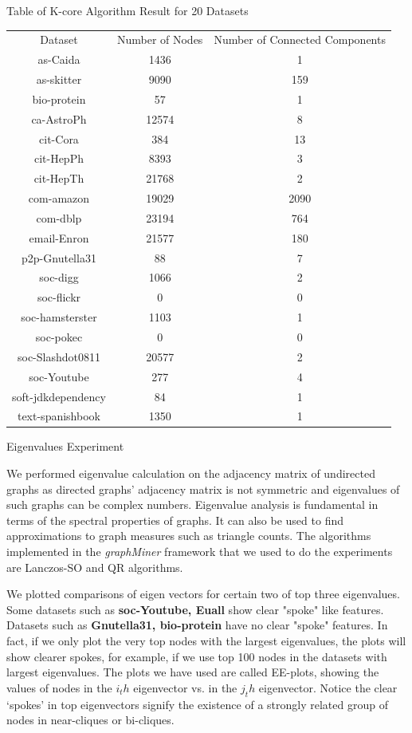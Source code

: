 \begin{center}
Table of K-core Algorithm Result for 20 Datasets
\begin{tabular}{ |c|c|c| }
 \hline
 Dataset & Number of Nodes & Number of Connected Components \\
  as-Caida & 1436 & 1 \\
  as-skitter & 9090 & 159 \\
  bio-protein & 57 & 1 \\
  ca-AstroPh & 12574 & 8 \\
  cit-Cora & 384 & 13 \\
  cit-HepPh & 8393 & 3 \\
  cit-HepTh & 21768 & 2 \\
  com-amazon & 19029 & 2090 \\
  com-dblp & 23194 & 764 \\
  email-Enron & 21577 & 180 \\
  p2p-Gnutella31 & 88 & 7 \\
  soc-digg & 1066 & 2 \\
  soc-flickr & 0 & 0 \\
  soc-hamsterster & 1103 & 1 \\
  soc-pokec & 0 & 0 \\
  soc-Slashdot0811 & 20577 & 2 \\
  soc-Youtube & 277 & 4 \\
  soft-jdkdependency & 84 & 1 \\
  text-spanishbook & 1350 & 1 \\
 \hline
\end{tabular}
\end{center}


Eigenvalues Experiment

We performed eigenvalue calculation on the adjacency matrix of undirected graphs as directed graphs' adjacency matrix is not symmetric and eigenvalues of such graphs can be complex numbers. Eigenvalue analysis is fundamental in terms of the spectral properties of graphs. It can also be used to find approximations to graph measures such as triangle counts.  The algorithms implemented in the {\em graphMiner} framework that we used to do the experiments are Lanczos-SO and QR algorithms.

We plotted comparisons of eigen vectors for certain two of top three eigenvalues. Some datasets such as \textbf{soc-Youtube, Euall} show clear "spoke" like features. Datasets such as \textbf{Gnutella31, bio-protein} have no clear "spoke" features. In fact, if we only plot the very top nodes with the largest eigenvalues, the plots will show clearer spokes, for example, if we use top 100 nodes in the datasets with largest eigenvalues. The plots we have used are called EE-plots, showing the values of nodes in the $i_th$ eigenvector vs. in the $j_th$ eigenvector. Notice the clear ‘spokes’ in top eigenvectors signify the existence of a strongly related group of nodes in near-cliques or bi-cliques. 

